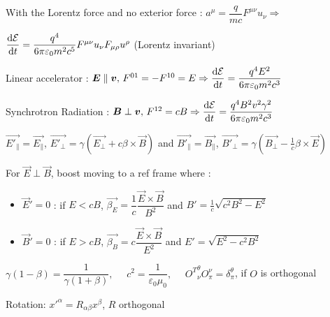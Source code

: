 \item[] With the Lorentz force and no exterior force : $a^{\mu} = \dfrac{q}{mc} F^{\mu\nu}u_{\nu} \Rightarrow $

\item $\dfrac{\textrm{d} \mathcal{E}}{\textrm{d} t} =  \dfrac{q^4}{6\pi\varepsilon_0m^2c^5}F^{\mu\nu}u_{\nu}F_{\mu\rho}u^{\rho}$ \quad (Lorentz invariant)
\squishend
{}

\squishlist
\item Linear accelerator : $ \mbox{\boldmath$E$} \parallel \mbox{\boldmath$v$}, \, F^{01} = -F^{10} = E \Rightarrow \dfrac{\textrm{d} \mathcal{E}}{\textrm{d} t} = \dfrac{q^4E^2}{6\pi\varepsilon_0m^2c^3}$

\item Synchrotron Radiation : $\mbox{\boldmath$B$} \perp \mbox{\boldmath$v$}, \, F^{12} = cB \Rightarrow \dfrac{\textrm{d} \mathcal{E}}{\textrm{d} t} = \dfrac{q^4B^2v^2\gamma^2}{6\pi\varepsilon_0m^2c^3}$
\squishend

\squishlist
\item $\vec{E'_{\parallel}}=\vec{E_{\parallel}}$, $\vec{E'_\perp}=\gamma(\vec{E_\perp}+c\beta\times\vec{B})$ and $\vec{B'_{\parallel}}=\vec{B_{\parallel}}$, $\vec{B'_\perp}=\gamma(\vec{B_\perp}-\frac{1}{c}\beta\times\vec{E})$

\item For $\vec{E}\perp\vec{B}$, boost moving to a ref frame where : 
\begin{itemize}
\item $\vec{E}'=0$ : if $E<cB$, $\vec{\beta_E}=\dfrac{1}{c}\dfrac{\vec{E}\times\vec{B}}{B^2}$ and $B'=\frac{1}{c}\sqrt{c^2B^2-E^2}$ 
\item $\vec{B}'=0$ : if $E>cB$, $\vec{\beta_B}=c\dfrac{\vec{E}\times\vec{B}}{E^2}$ and $E'=\sqrt{E^2-c^2B^2}$
\end{itemize}

\squishend


\squishlist%
\item $\gamma(1-\beta) = \dfrac{1}{\gamma(1+\beta)}, \quad  \,\, c^2 = \dfrac{1}{\varepsilon_0\mu_0}, \quad \,\, {O^T}^{\theta}_{\nu} O^{\nu}_{\pi} = \delta^{\theta}_{\pi}$, if $O$ is orthogonal
\item Rotation: $x'^\alpha=R_{\alpha \beta}x^\beta$, $R$ orthogonal

